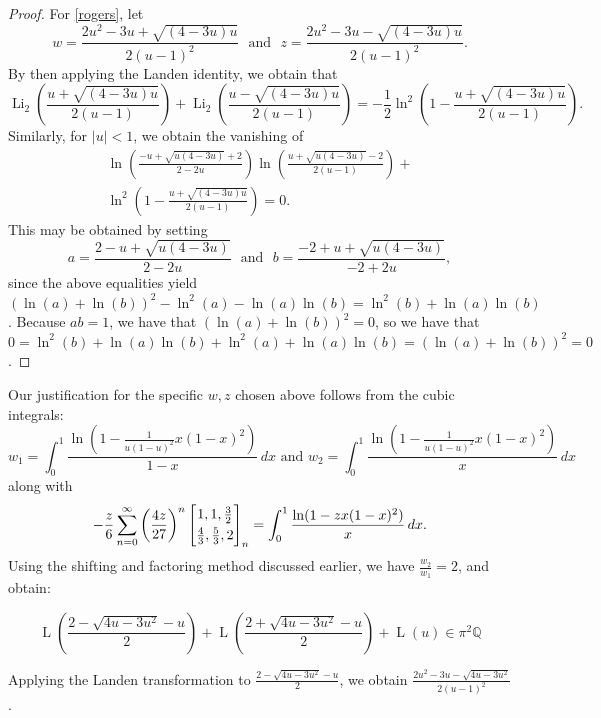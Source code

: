 \documentclass[12pt]{article}
\begin{document}
\begin{proof}
For \eqref{rogers}, let $$ w = \frac{2u^2 - 3u + \sqrt{(4 - 3u)u}}{2(u - 1)^2} \ \ \ \text{and} \ \ \ 
 z = \frac{2u^2 - 3u - \sqrt{(4 - 3u)u}}{2(u - 1)^2}. $$ By then applying the Landen identity, we obtain that 
 $$ \operatorname{Li}_2 \left(\frac{u + \sqrt{(4 - 3u) u}}{2 (u - 1)}\right) + \operatorname{Li}_2\left(\frac{u - 
 \sqrt{(4 - 3u) u}}{2 (u - 1)}\right) = -\frac{1}{2} \ln^2\left(1 - \frac{u + \sqrt{(4 - 3u) u}}{2 (u - 1)}\right). $$ 
 Similarly, for $ |u|<1$, we obtain the vanishing of 
\begin{multline*}
 \ln\left(\frac{-u + \sqrt{u (4-3u)} + 2}{2 - 2 u}\right) \ln\left(\frac{u + \sqrt{u (4-3u)} - 2}{2 (u - 1)}\right) + \\ 
 \ln^2\left(1 - \frac{u + \sqrt{(4 - 3 u) u}}{2 (u - 1)}\right) = 0. 
\end{multline*}
 This may be obtained by setting $$ a = \frac{2 - u + \sqrt{u(4 - 3u)}}{2 - 2u} \ \ \ \text{and} \ \ \ b = \frac{-2 + u + \sqrt{u(4 - 
 3u)}}{-2 + 2u}, $$ since the above equalities yield $(\ln(a)+\ln(b))^2-\ln^2(a)-\ln(a)\ln(b)=\ln^2(b) + 
 \ln(a)\ln(b)$. Because $ab=1$, we have that $(\ln(a)+\ln(b))^2=0$, so we have that $0= \ln^2(b)+\ln(a)\ln(b) + 
 \ln^2(a)+\ln(a)\ln(b)=(\ln(a)+\ln(b))^2=0$. 
\end{proof}

\noindent Our justification for the specific $w,z$ chosen above follows from the cubic integrals: 
\begin{equation}\label{w1w2forCampbell}
w_1 = \int_{0}^{1} \frac{\ln\left(1 - \frac{1}{u(1-u)^2} x(1-x)^2\right)}{1-x} \, dx \text{ and } w_2 = \int_{0}^{1} \frac{\ln\left(1 - \frac{1}{u(1-u)^2} x(1-x)^2\right)}{x} \, dx 
\end{equation}
 along with 
\[ -\frac{z}{6} \sum_{n=0}^{\infty} \left( \frac{4z}{27} \right)^n 
 \left[ \begin{matrix} 
 1, 1, \frac{3}{2} 
 \vspace{1mm} \\ 
 \frac{4}{3}, \frac{5}{3}, 2 \end{matrix} \right]_{n} = 
 \int_0^1 \frac{\ln(1 - z x (1 - x)^2)}{x} \, dx. 
\]
  Using the shifting and factoring method discussed earlier, we have $\frac{w_2}{w_1}=2$, and obtain:
  
  $$ \operatorname{L}\left( \frac{ 2-\sqrt{4u - 
 3 u^2} -u }{2} \right) + \operatorname{L}\left( \frac{2+\sqrt{4u-3 u^2} -u}{2} \right) + 
 \operatorname{L}(u) \in \pi^2 \mathbb{Q}$$

\noindent Applying the Landen transformation to $ \frac{ 2-\sqrt{4u - 
 3 u^2} -u }{2} $, we obtain  $\frac{2u^2 - 3u - \sqrt{4u - 3u^2}}{2(u - 1)^2}$.
\end{document}
